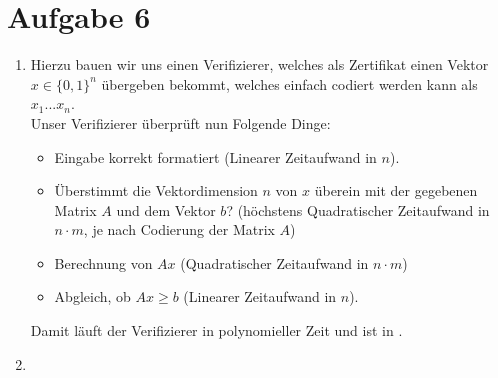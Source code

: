 \documentclass[a4paper,11pt]{scrartcl}
\begin{document}
	\section*{Aufgabe 6}
	\begin{enumerate}[label=(\alph*)]
	\item
		Hierzu bauen wir uns einen Verifizierer, welches als Zertifikat einen Vektor $x \in \{0,1\}^n$ übergeben bekommt, welches einfach codiert werden kann als $x_1 ... x_n$.\\
		Unser Verifizierer überprüft nun Folgende Dinge:
		\begin{itemize}
		\item	Eingabe korrekt formatiert (Linearer Zeitaufwand in $n$).
		\item	Überstimmt die Vektordimension $n$ von $x$ überein mit der gegebenen Matrix $A$ und dem Vektor $b$? (höchstens Quadratischer Zeitaufwand in $n \cdot m$, je nach Codierung der Matrix $A$)
		\item	Berechnung von $Ax$ (Quadratischer Zeitaufwand in $n \cdot m$)
		\item	Abgleich, ob $Ax \geq b$ (Linearer Zeitaufwand in $n$).
		\end{itemize}
		Damit läuft der Verifizierer in polynomieller Zeit und  ist in .
		
	\item 
	\end{enumerate}
	
\end{document}
